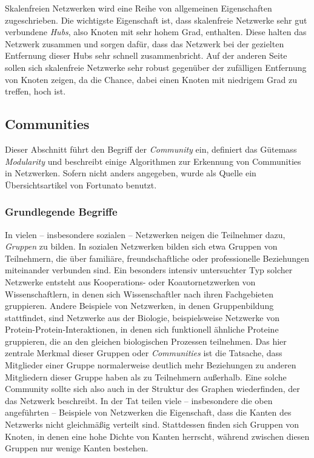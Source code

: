 Skalenfreien Netzwerken wird eine Reihe von allgemeinen Eigenschaften
zugeschrieben. Die wichtigste Eigenschaft ist, dass skalenfreie
Netzwerke sehr gut verbundene \emph{Hubs}, also Knoten mit sehr hohem
Grad, enthalten. Diese halten das Netzwerk zusammen und sorgen
dafür, dass das Netzwerk bei der gezielten Entfernung dieser Hubs
sehr schnell zusammenbricht. Auf der anderen Seite sollen sich
skalenfreie Netzwerke sehr robust gegenüber der zufälligen
Entfernung von Knoten zeigen, da die Chance, dabei einen Knoten mit
niedrigem Grad zu treffen, hoch ist\cite{Albert2000}.

\subsection{Communities}
\label{ch:Grundlagen:sec:Netzwerkanalyse:subsec:Communities}

Dieser Abschnitt führt den Begriff der \emph{Community} ein,
definiert das Gütemass \emph{Modularity} und beschreibt einige
Algorithmen zur Erkennung von Communities in Netzwerken. Sofern nicht
anders angegeben, wurde als Quelle ein Übersichtsartikel von
Fortunato \cite{Fortunato2010} benutzt.

\subsubsection{Grundlegende Begriffe}
\label{sec:grundl-begr}

In vielen -- insbesondere sozialen -- Netzwerken neigen die Teilnehmer
dazu, \emph{Gruppen} zu bilden. In sozialen Netzwerken bilden sich
etwa Gruppen von Teilnehmern, die über familiäre,
freundschaftliche oder professionelle Beziehungen miteinander
verbunden sind. Ein besonders intensiv untersuchter Typ solcher
Netzwerke entsteht aus Kooperations- oder Koautornetzwerken von
Wissenschaftlern, in denen sich Wissenschaftler nach ihren
Fachgebieten gruppieren. Andere Beispiele von Netzwerken, in denen
Gruppenbildung stattfindet, sind Netzwerke aus der Biologie,
beispielsweise Netzwerke von Protein-Protein-Interaktionen, in denen
sich funktionell ähnliche Proteine gruppieren, die an den gleichen
biologischen Prozessen teilnehmen. Das hier zentrale Merkmal dieser
Gruppen oder \emph{Communities} ist die Tatsache, dass Mitglieder
einer Gruppe normalerweise deutlich mehr Beziehungen zu anderen
Mitgliedern dieser Gruppe haben als zu Teilnehmern außerhalb. Eine
solche Community sollte sich also auch in der Struktur des Graphen
wiederfinden, der das Netzwerk beschreibt. In der Tat teilen viele --
insbesondere die oben angeführten -- Beispiele von Netzwerken die
Eigenschaft, dass die Kanten des Netzwerks nicht gleichmäßig
verteilt sind. Stattdessen finden sich Gruppen von Knoten, in denen
eine hohe Dichte von Kanten herrscht, während zwischen diesen
Gruppen nur wenige Kanten bestehen.

